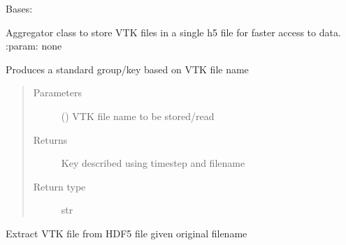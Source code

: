 \documentclass[letterpaper,10pt,english]{sphinxmanual}
\begin{document}
\begin{fulllineitems}
\label{\detokenize{openfdem:openfdem.aggregate_storage.aggregate_storage}}
Bases: 

Aggregator class to store VTK files in a single h5 file for faster access to data.
:param: none

\begin{fulllineitems}
\label{\detokenize{openfdem:openfdem.aggregate_storage.aggregate_storage.file_group_key}}
Produces a standard group/key based on VTK file name
\begin{quote}\begin{description}
\item[{Parameters}] \leavevmode
{} () \textendash{} VTK file name to be stored/read

\item[{Returns}] \leavevmode
Key described using timestep and filename

\item[{Return type}] \leavevmode
str

\end{description}\end{quote}

\end{fulllineitems}


\begin{fulllineitems}
\label{\detokenize{openfdem:openfdem.aggregate_storage.aggregate_storage.read_file}}
Extract VTK file from HDF5 file given original filename


\end{fulllineitems}
\end{fulllineitems}
\end{document}
